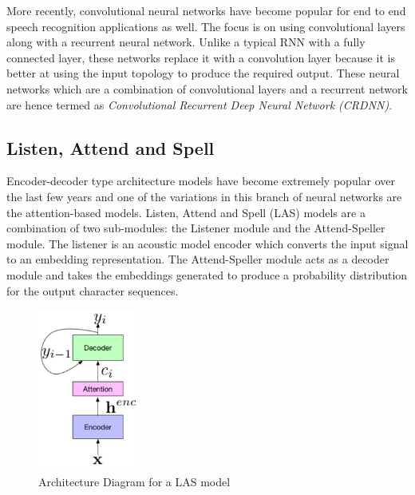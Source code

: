 More recently, convolutional neural networks have become popular for end to end speech recognition applications as well. \cite{Zhang2017VeryRecognition} The focus is on using convolutional layers along with a recurrent neural network. Unlike a typical RNN with a fully connected layer, these networks replace it with a convolution layer because it is better at using the input topology to produce the required output. These neural networks which are a combination of convolutional layers and a recurrent network are hence termed as \emph{Convolutional Recurrent Deep Neural Network (CRDNN)}. 

\subsection {Listen, Attend and Spell}
Encoder-decoder type architecture models have become extremely popular over the last few years and one of the variations in this branch of neural networks are the attention-based models. \cite{VaswaniAttentionNeed,  Prabhavalkar2017ARecognition} Listen, Attend and Spell (LAS) models are a combination of two sub-modules: the Listener module and the Attend-Speller module. The listener is an acoustic model encoder which converts the input signal to an embedding representation. The Attend-Speller module acts as a decoder module and takes the embeddings generated to produce a probability distribution for the output character sequences. \cite{Zhang2017VeryRecognition, Chan2016ListenRecognition}

\begin{figure}[ht]
  \begin{center}
    \includegraphics[width=0.3\textwidth]{images/las.png} 
    \caption{Architecture Diagram for a LAS model  \cite{Chiu2017State-of-the-artModels}}
    \label{fig:las}
  \end{center}
\end{figure}

